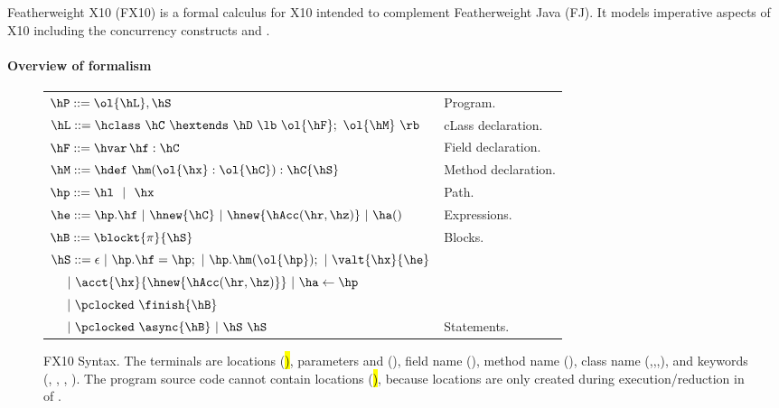 Featherweight X10 (FX10) is a formal calculus for X10 intended to  complement Featherweight Java
(FJ).  It models imperative aspects of X10 including the concurrency
constructs \hfinish{} and \hasync{}.


\paragraph{Overview of formalism}

\begin{figure}[htpb!]
\begin{center}
\begin{tabular}{|l|l|}
\hline

$\hP ::= \ol{\hL},\hS$ & Program. \\

$\hL ::= \hclass ~ \hC~\hextends~\hD~\lb~\ol{\hF};~\ol{\hM}~\rb$
& cLass declaration. \\

$\hF ::= \hvar\,\hf:\hC$
& Field declaration. \\

$\hM ::= \hdef\ \hm(\ol{\hx}:\ol{\hC}):\hC\{\hS\}$
& Method declaration. \\

$\hp ::= \hl ~~|~~ \hx$
& Path. \\ %

$\he ::=  \hp.\hf  ~|~ \hnew{\hC} ~|~ \hnew{\hAcc(\hr,\hz)}~|~ \ha()$
& Expressions. \\ %
$\hB ::= \blockt{\pi}{\hS}$
& Blocks. \\
$\hS ::=  \epsilon ~|~\hp.\hf = \hp; ~|~ \hp.\hm(\ol{\hp});  ~|~ \valt{\hx}{\he}$ &\\
$~~~~|~\acct{\hx}{\hnew{\hAcc(\hr,\hz)}} ~|~ \ha \leftarrow \hp$ &\\
$~~~~|~ \pclocked~\finish{\hB}$&\\
$~~~~|~ \pclocked~\async{\hB}~|~ \hS~\hS$
& Statements. \\ %

\hline
\end{tabular}
\end{center}
\caption{FX10 Syntax.
    The terminals are locations (\hl), parameters and \hthis (\hx), field name (\hf), method name (\hm), class name (\hB,\hC,\hD,\hObject),
        and keywords (\hhnew, \hfinish, \hasync, ).
    The program source code cannot contain locations (\hl), because locations are only created during execution/reduction in  of .
    }
\label{Figure:syntax}
\end{figure}

